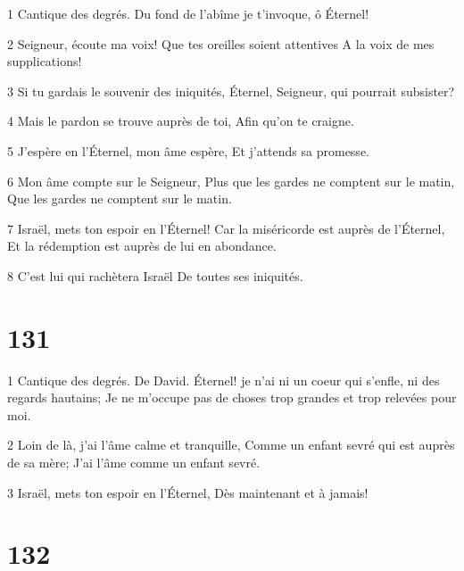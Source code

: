 \par 1 Cantique des degrés. Du fond de l'abîme je t'invoque, ô Éternel!
\par 2 Seigneur, écoute ma voix! Que tes oreilles soient attentives A la voix de mes supplications!
\par 3 Si tu gardais le souvenir des iniquités, Éternel, Seigneur, qui pourrait subsister?
\par 4 Mais le pardon se trouve auprès de toi, Afin qu'on te craigne.
\par 5 J'espère en l'Éternel, mon âme espère, Et j'attends sa promesse.
\par 6 Mon âme compte sur le Seigneur, Plus que les gardes ne comptent sur le matin, Que les gardes ne comptent sur le matin.
\par 7 Israël, mets ton espoir en l'Éternel! Car la miséricorde est auprès de l'Éternel, Et la rédemption est auprès de lui en abondance.
\par 8 C'est lui qui rachètera Israël De toutes ses iniquités.

\chapter{131}

\par 1 Cantique des degrés. De David. Éternel! je n'ai ni un coeur qui s'enfle, ni des regards hautains; Je ne m'occupe pas de choses trop grandes et trop relevées pour moi.
\par 2 Loin de là, j'ai l'âme calme et tranquille, Comme un enfant sevré qui est auprès de sa mère; J'ai l'âme comme un enfant sevré.
\par 3 Israël, mets ton espoir en l'Éternel, Dès maintenant et à jamais!

\chapter{132}

